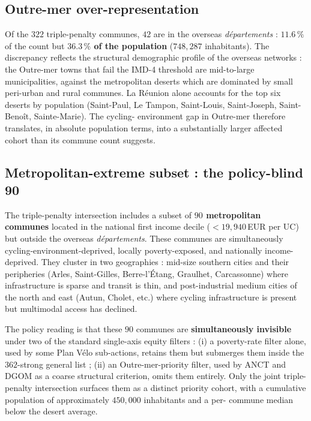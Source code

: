 \documentclass[11pt,a4paper]{article}
\begin{document}
\subsection{Outre-mer over-representation}

Of the $322$ triple-penalty communes, $42$ are in the overseas
\emph{d\'epartements} : $11.6\,\%$ of the count but
\textbf{$36.3\,\%$ of the population} ($748{,}287$ inhabitants).
The discrepancy reflects the structural demographic profile of
the overseas networks : the Outre-mer towns that fail the IMD-4
threshold are mid-to-large municipalities, against the
metropolitan deserts which are dominated by small peri-urban and
rural communes.  La R\'eunion alone accounts for the top six
deserts by population (Saint-Paul, Le Tampon, Saint-Louis,
Saint-Joseph, Saint-Beno\^it, Sainte-Marie).  The cycling-
environment gap in Outre-mer therefore translates, in absolute
population terms, into a substantially larger affected cohort
than its commune count suggests.

\subsection{Metropolitan-extreme subset : the policy-blind 90}
\label{sec:metro-extreme}

The triple-penalty intersection includes a subset of
\textbf{$90$ metropolitan communes} located in the national
first income decile ($< 19{,}940$\,EUR per UC) but outside the
overseas \emph{d\'epartements}.  These communes are simultaneously
cycling-environment-deprived, locally poverty-exposed, and
nationally income-deprived.  They cluster in two geographies :
mid-size southern cities and their peripheries (Arles,
Saint-Gilles, Berre-l'\'Etang, Graulhet, Carcassonne) where
infrastructure is sparse and transit is thin, and post-industrial
medium cities of the north and east (Autun, Cholet, etc.) where
cycling infrastructure is present but multimodal access has
declined.

The policy reading is that these $90$ communes are
\textbf{simultaneously invisible} under two of the standard
single-axis equity filters : (i) a poverty-rate filter alone, used
by some Plan V\'elo sub-actions, retains them but submerges them
inside the $362$-strong general list ; (ii) an Outre-mer-priority
filter, used by ANCT and DGOM as a coarse structural criterion,
omits them entirely.  Only the joint triple-penalty intersection
surfaces them as a distinct priority cohort, with a cumulative
population of approximately $450{,}000$ inhabitants and a per-
commune median below the desert average.
\end{document}
